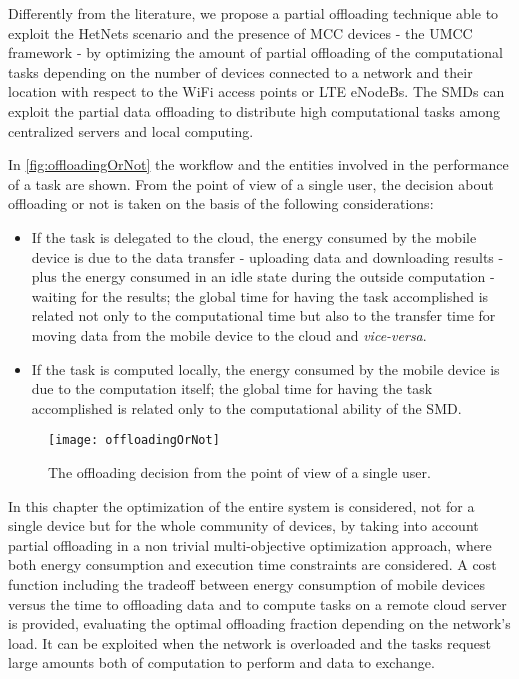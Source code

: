 \documentclass[twoside,openright]{report}
\begin{document}
Differently from the literature, we propose a partial offloading technique able to exploit the \glspl{HetNet} scenario and the presence of \gls{MCC} devices - the \gls{UMCC} framework - by optimizing the amount of partial offloading of the computational tasks depending on the number of devices connected to a network and their location with respect to the \gls{WiFi} access points or \gls{LTE} eNodeBs.  
The \glspl{SMD} can exploit the partial data offloading to distribute high computational tasks among centralized servers and local computing.
 
In \autoref{fig:offloadingOrNot} the workflow and the entities involved in the performance of a task are shown. From the point of view of a single user, the decision about offloading or not is taken on the basis of the following considerations:
\begin{itemize}
\item If the task is delegated to the cloud, the energy consumed by the mobile device is due to the data transfer - uploading data and downloading results - plus the energy consumed in an idle state during the outside computation  - waiting for the results; the global time for having the task accomplished is related not only to the computational time but also to the transfer time for moving data from the mobile device to the cloud and \emph{vice-versa}.

\item If the task is computed locally, the energy consumed by the mobile device is due to the computation itself; the global time for having the task accomplished is related only to the computational ability of the \gls{SMD}.
\end{itemize}
\begin{figure}[tbp]
\centering
\texttt{[image: offloadingOrNot]}
\caption{The offloading decision from the point of view of a single user.}
\label{fig:offloadingOrNot}
\end{figure}

In this chapter the optimization of the entire system is considered, not for a single device but for the whole community of devices, by taking into account partial offloading in a non trivial multi-objective optimization approach, where both energy consumption and execution time constraints are considered. 
A cost function including the tradeoff between energy consumption of mobile devices versus the time to offloading data and to compute tasks on a remote cloud server is provided, evaluating the optimal offloading fraction depending on the network's load.
It can be exploited when the network is overloaded and the tasks  request large amounts both of computation to perform and data to exchange.  
\end{document}
